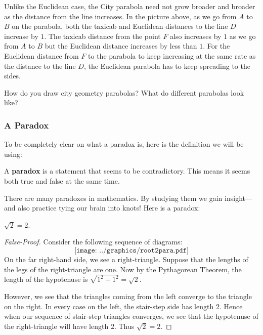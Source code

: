 Unlike the Euclidean case, the City parabola need not grow broader and
broader as the distance from the line increases. In the picture above,
as we go from $A$ to $B$ on the parabola, both the taxicab and
Euclidean distances to the line $D$ increase by $1$. The taxicab
distance from the point $F$ also increases by $1$ as we go from $A$ to
$B$ but the Euclidean distance increases by less than $1$. For the
Euclidean distance from $F$ to the parabola to keep increasing at the
same rate as the distance to the line $D$, the Euclidean parabola has
to keep spreading to the sides.

\begin{question}How do you draw city geometry parabolas? What do different parabolas look like?
\end{question}
\QM



\subsubsection{A Paradox}

To be completely clear on what a paradox is, here is the definition we
will be using:
\begin{definition} A \textbf{paradox} is a statement that seems to be contradictory. This means it seems both true and false at the same time. 
\end{definition}

There are many paradoxes in mathematics. By studying them we gain
insight---and also practice tying our brain into knots! Here is a paradox:

\begin{paradox} $\sqrt{2} = 2$.
\end{paradox}

\begin{proof}[False-Proof] Consider the following sequence of diagrams:
\[
\texttt{[image: ../graphics/root2para.pdf]}
\]
On the far right-hand side, we see a right-triangle. Suppose that the
lengths of the legs of the right-triangle are one. Now by the
Pythagorean Theorem, the length of the hypotenuse is $\sqrt{1^2+1^2}
=\sqrt{2}.$

However, we see that the triangles coming from the left converge to
the triangle on the right. In every case on the left, the stair-step
side has length $2$. Hence when our sequence of stair-step triangles
converges, we see that the hypotenuse of the right-triangle will have
length $2$. Thus $\sqrt{2} = 2$.
\end{proof}

